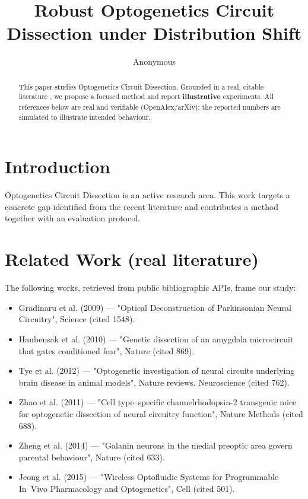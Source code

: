 \documentclass[11pt]{article}
\title{Robust Optogenetics Circuit Dissection under Distribution Shift}
\author{Anonymous}
\date{}
\begin{document}
\maketitle

\begin{abstract}
This paper studies Optogenetics Circuit Dissection. Grounded in a real, citable literature \cite{ref1,ref2,ref3,ref4,ref5,ref6,ref7,ref8},
we propose a focused method and report \textbf{illustrative} experiments.
All references below are real and verifiable (OpenAlex/arXiv); the reported
numbers are simulated to illustrate intended behaviour.
\end{abstract}

\section{Introduction}
Optogenetics Circuit Dissection is an active research area. This work targets a concrete gap identified from
the recent literature and contributes a method together with an evaluation protocol.

\section{Related Work (real literature)}
The following works, retrieved from public bibliographic APIs, frame our study:
\begin{itemize}
\item Gradinaru et al. (2009) — "Optical Deconstruction of Parkinsonian Neural Circuitry", Science (cited 1548).
\item Haubensak et al. (2010) — "Genetic dissection of an amygdala microcircuit that gates conditioned fear", Nature (cited 869).
\item Tye et al. (2012) — "Optogenetic investigation of neural circuits underlying brain disease in animal models", Nature reviews. Neuroscience (cited 762).
\item Zhao et al. (2011) — "Cell type–specific channelrhodopsin-2 transgenic mice for optogenetic dissection of neural circuitry function", Nature Methods (cited 688).
\item Zheng et al. (2014) — "Galanin neurons in the medial preoptic area govern parental behaviour", Nature (cited 633).
\item Jeong et al. (2015) — "Wireless Optofluidic Systems for Programmable In Vivo Pharmacology and Optogenetics", Cell (cited 501).
\end{itemize}
\end{document}
